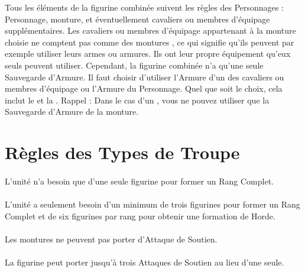 Tous les éléments de la figurine combinée suivent les règles des Personnages : Personnage, monture, et éventuellement cavaliers ou membres d'équipage supplémentaires. Les cavaliers ou membres d'équipage appartenant à la monture choisie ne comptent pas comme des \og montures \fg{}, ce qui signifie qu'ils peuvent par exemple utiliser leurs armes ou armures. Ils ont leur propre équipement qu'eux seuls peuvent utiliser. Cependant, la figurine combinée n'a qu'une seule Sauvegarde d'Armure. Il faut choisir d'utiliser l'Armure d'un des cavaliers ou membres d'équipage ou l'Armure du Personnage. Quel que soit le choix, cela inclut le \barding{} et la \mountsprotection{}. Rappel : Dans le cas d'un \riddenmonster{}, vous ne pouvez utiliser que la Sauvegarde d'Armure de la monture.

\section{Règles des Types de Troupe}

\paragraph{\newfromWHB{\monsterranks}}

L'unité n'a besoin que d'une seule figurine pour former un Rang Complet.

\paragraph{\monstrousranks}

L'unité a seulement besoin d'un minimum de trois figurines pour former un Rang Complet et de six figurines par rang pour obtenir une formation de Horde.

\paragraph{\cavalrysupport}

Les montures ne peuvent pas porter d'Attaque de Soutien.

\paragraph{\monstroussupport}

La figurine peut porter jusqu'à trois Attaques de Soutien au lieu d'une seule.

\newpage
\paragraph{\combinedprofile}

